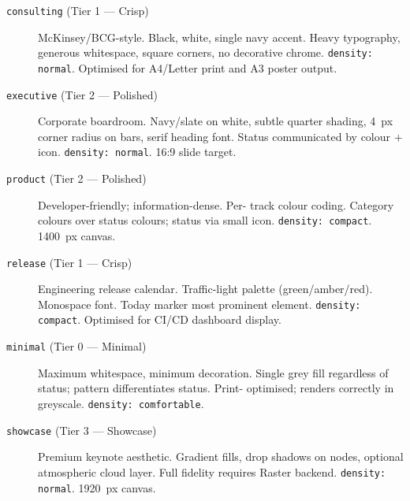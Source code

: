 \begin{description}
  \item[\texttt{consulting} (Tier 1 — Crisp)] McKinsey/BCG-style. Black, white, single navy
        accent. Heavy typography, generous whitespace, square corners, no decorative chrome.
        \texttt{density: normal}. Optimised for A4/Letter print and A3 poster output.

  \item[\texttt{executive} (Tier 2 — Polished)] Corporate boardroom. Navy/slate on white,
        subtle quarter shading, 4~px corner radius on bars, serif heading font. Status
        communicated by colour $+$ icon. \texttt{density: normal}. 16:9 slide target.

  \item[\texttt{product} (Tier 2 — Polished)] Developer-friendly; information-dense. Per-
        track colour coding. Category colours over status colours; status via small icon.
        \texttt{density: compact}. 1400~px canvas.

  \item[\texttt{release} (Tier 1 — Crisp)] Engineering release calendar. Traffic-light
        palette (green/amber/red). Monospace font. Today marker most prominent element.
        \texttt{density: compact}. Optimised for CI/CD dashboard display.

  \item[\texttt{minimal} (Tier 0 — Minimal)] Maximum whitespace, minimum decoration.
        Single grey fill regardless of status; pattern differentiates status. Print-
        optimised; renders correctly in greyscale. \texttt{density: comfortable}.

  \item[\texttt{showcase} (Tier 3 — Showcase)] Premium keynote aesthetic. Gradient fills,
        drop shadows on nodes, optional atmospheric cloud layer. Full fidelity requires
        Raster backend. \texttt{density: normal}. 1920~px canvas.
\end{description}

